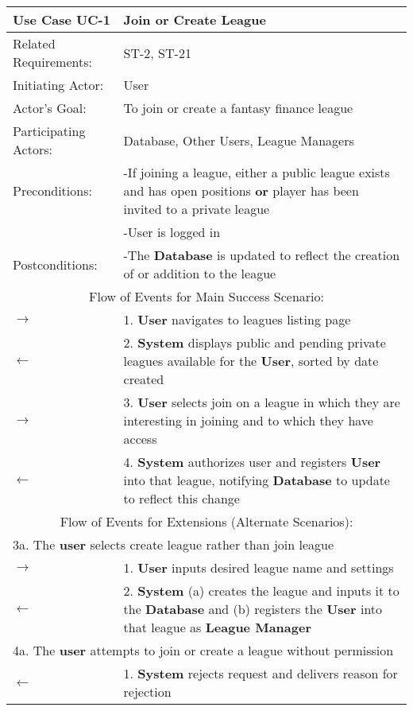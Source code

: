 \begin{centering}
\renewcommand\arraystretch{1.3} %
\begin{longtable}{|p{1.2in} p{5in}|}
\hline
\bfseries{\color{color1}Use Case UC-1} & \bfseries{\color{color1}Join or Create League} \\
\hline
Related Requirements: & ST-2, ST-21 \\ 
Initiating Actor:     & User \\
Actor's Goal:         & To join or create a fantasy finance league \\
Participating Actors:  & Database, Other Users, League Managers\\
Preconditions:        & -If joining a league, either a public league exists and has open positions \textbf{or} player has been invited to a private league\\
 & -User is logged in \\
Postconditions:       & -The \textbf{Database} is updated to reflect the creation of or addition to the league \\
\hline
\multicolumn{2}{|c|}{\color{color1}Flow of Events for Main Success Scenario:}\\
\hline
$\rightarrow$ & 1. \textbf{User} navigates to leagues listing page \\
$\leftarrow$ & 2. \textbf{System} displays public and pending private leagues available for the \textbf{User}, sorted by date created \\
$\rightarrow$ & 3. \textbf{User} selects join on a league in which they are interesting in joining and to which they have access \\
$\leftarrow$ & 4. \textbf{System} authorizes user and registers \textbf{User} into that league, notifying \textbf{Database} to update to reflect this change \\
\hline
\multicolumn{2}{|c|}{\color{color1}Flow of Events for Extensions (Alternate Scenarios):} \\
\hline
\multicolumn{2}{|p{6.2in}|}{3a. The \textbf{user} selects create league rather than join league} \\
\hline
$\rightarrow$ & 1.  \textbf{User} inputs desired league name and settings \\
$\leftarrow$ & 2. \textbf{System} (a) creates the league and inputs it to the \textbf{Database} and (b) registers the \textbf{User} into that league as \textbf{League Manager} \\
\hline
\multicolumn{2}{|p{6.2in}|}{4a. The \textbf{user} attempts to join or create a league without permission} \\
\hline
$\leftarrow$ & 1.  \textbf{System} rejects request and delivers reason for rejection \\
\hline
\end{longtable}
\end{centering}

